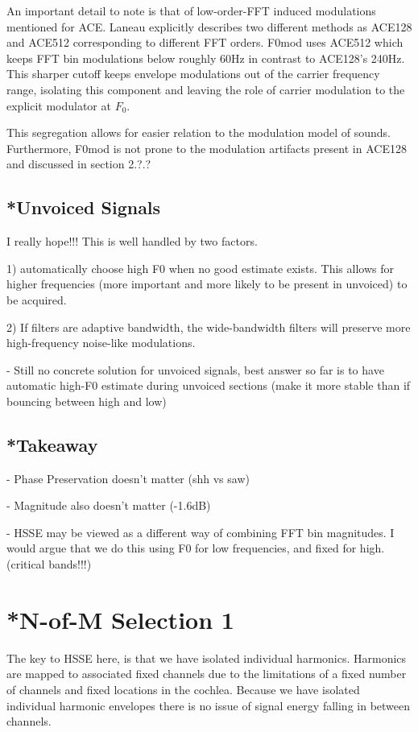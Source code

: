 \documentclass [11pt, proquest] {uwthesis}[2015/03/03]
\begin{document}
An important detail to note is that of low-order-FFT induced modulations mentioned for ACE.  Laneau explicitly describes two different methods as ACE128 and ACE512 corresponding to different FFT orders.  F0mod uses ACE512 which keeps FFT bin modulations below roughly 60Hz in contrast to ACE128's 240Hz.  This sharper cutoff keeps envelope modulations out of the carrier frequency range, isolating this component and leaving the role of carrier modulation to the explicit modulator at $F_0$.

This segregation allows for easier relation to the modulation model of sounds.  Furthermore, F0mod is not prone to the modulation artifacts present in ACE128 and discussed in section 2.?.?

\subsection{*Unvoiced Signals}

I really hope!!!  This is well handled by two factors.

1) automatically choose high F0 when no good estimate exists.  This allows for higher frequencies (more important and more likely to be present in unvoiced) to be acquired.

2) If filters are adaptive bandwidth, the wide-bandwidth filters will preserve more high-frequency noise-like modulations.


 - Still no concrete solution for unvoiced signals, best answer so far is to have automatic high-F0 estimate during unvoiced sections (make it more stable than if bouncing between high and low)

\subsection{*Takeaway}

 - Phase Preservation doesn't matter (shh vs saw)
 
 - Magnitude also doesn't matter (-1.6dB)
 
 - HSSE may be viewed as a different way of combining FFT bin magnitudes.  I would argue that we do this using F0 for low frequencies, and fixed for high.  (critical bands!!!)

\section{*N-of-M Selection 1}

The key to HSSE here, is that we have isolated individual harmonics.  Harmonics are mapped to associated fixed channels due to the limitations of a fixed number of channels and fixed locations in the cochlea.  Because we have isolated individual harmonic envelopes there is no issue of signal energy falling in between channels.
\end{document}
